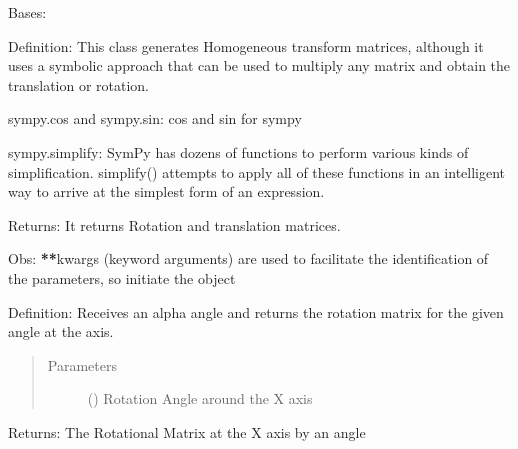 \documentclass[letterpaper,10pt,english,openany,oneside]{sphinxmanual}
\begin{document}
\begin{fulllineitems}
\label{\detokenize{ForwardKinematics:Forward_Kinematics.ForwardKinematics}}
Bases: 

Definition: This class generates Homogeneous transform matrices, although it uses a symbolic approach
that can be used to multiply any matrix and obtain the translation or rotation.

sympy.cos and sympy.sin: cos and sin for sympy

sympy.simplify: SymPy has dozens of functions to perform various kinds of simplification.
simplify() attempts to apply all of these functions
in an intelligent way to arrive at the simplest form of an expression.

Returns: It returns Rotation and translation matrices.

Obs: {\color{red}\bfseries{}**}kwargs (keyword arguments) are used to facilitate the identification of the parameters, so initiate the
object

\begin{fulllineitems}
\label{\detokenize{ForwardKinematics:Forward_Kinematics.ForwardKinematics.rot_x}}
Definition: Receives an alpha angle and returns the rotation matrix for the given angle at the  axis.
\begin{quote}\begin{description}
\item[{Parameters}] \leavevmode
{} () \textendash{} Rotation Angle around the X axis

\end{description}\end{quote}

Returns: The Rotational Matrix at the X axis by an  angle

\end{fulllineitems}



\end{fulllineitems}
\end{document}
